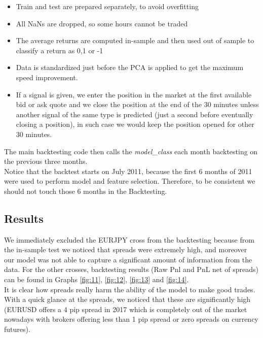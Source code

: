 \documentclass[a4paper]{article}
\begin{document}
\begin{itemize}
	\item Train and test are prepared separately, to avoid overfitting 
	\item All NaNs are dropped, so some hours cannot be traded
	\item The average returns are computed in-sample and then used out of sample to classify a return as 0,1 or -1
	\item Data is standardized just before the PCA is applied to get the maximum speed improvement.
	\item If a signal is given, we enter the position in the market at the first available bid or ask quote and we close the position at the end of the 30 minutes unless another signal of the same type is predicted (just a second before eventually closing a position), in such case we would keep the position opened for other 30 minutes.
\end{itemize}

The main backtesting code then calls the \textit{model\_class} each month backtesting on the previous three months.\\ Notice that the backtest starts on July 2011, because the first 6 months of 2011 were used to perform model and feature selection. Therefore, to be consistent we should not touch those 6 months in the Backtesting.\\

\subsection{Results}

We immediately excluded the EURJPY cross from the backtesting because from the in-sample test we noticed that spreads were extremely high, and moreover our model was not able to capture a significant amount of information from the data. For the other crosses, backtesting results (Raw Pnl and PnL net of spreads) can be found in Graphs \ref{fig:11}, \ref{fig:12}, \ref{fig:13} and \ref{fig:14}.\\
It is clear how spreads really harm the ability of the model to make good trades. With a quick glance at the spreads, we noticed that these are significantly high (EURUSD offers a 4 pip spread in 2017 which is completely out of the market nowadays with brokers offering less than 1 pip spread or zero spreads on currency futures).\\
\end{document}

